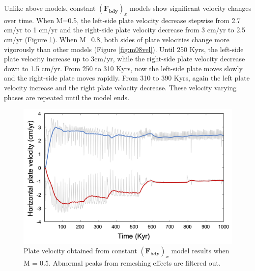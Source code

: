 \documentclass[letterpaper,12pt,notitle]{memphisthesis}                     %
\begin{document}
Unlike above models, constant $(\boldsymbol{F_{bdy}})_x$ models show significant velocity changes over time. 
When M=0.5, the left-side plate velocity decrease stepwise from 2.7 cm/yr to 1 cm/yr and the right-side plate velocity decrease from 3 cm/yr to 2.5 cm/yr (Figure \ref{fig:m05vel}).
When M=0.8, both sides of plate velocities change more vigorously than other models (Figure \ref{fig:m08vel}). Until 250 Kyrs, the left-side plate velocity increase up to 3cm/yr, while the right-side plate velocity decrease down to 1.5 cm/yr. From 250 to 310 Kyrs, now the left-side plate moves slowly and the right-side plate moves rapidly. From 310 to 390 Kyrs, again the left plate velocity increase and the right plate velocity decrease. These velocity varying phases are repeated until the model ends.


\begin{figure}[!htb]
	\centering
	\includegraphics[width=0.9\linewidth]{./figs/m05vel.png}
	\caption{Plate velocity obtained from constant $(\boldsymbol{F_{bdy}})_x$ model results when M = 0.5. Abnormal peaks from remeshing effects are filtered out.}
	\label{fig:m05vel}
\end{figure}


\end{document}
